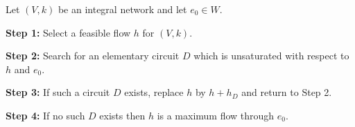 Let $(V, k)$ be an integral network and let $e_0 \in W$.

\textbf{Step 1:} Select a feasible flow $h$ for $(V, k)$.

\textbf{Step 2:} Search for an elementary circuit $D$ which is unsaturated with respect to $h$ and $e_0$.

\textbf{Step 3:} If such a circuit $D$ exists, replace $h$ by $h + h_D$ and return to Step 2.

\textbf{Step 4:} If no such $D$ exists then $h$ is a maximum flow through $e_0$.
